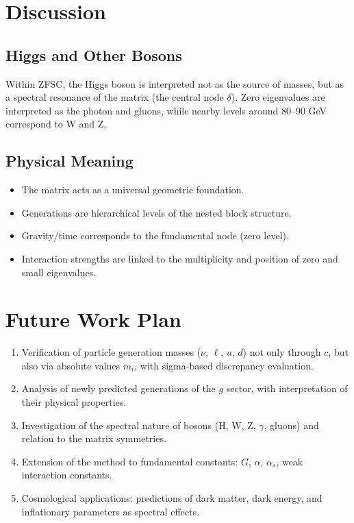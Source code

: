 \documentclass[12pt,a4paper]{article}
\begin{document}
\section{Discussion}
\subsection{Higgs and Other Bosons}
Within ZFSC, the Higgs boson is interpreted not as the source of masses, but as a spectral resonance of the matrix (the central node $\delta$). 
Zero eigenvalues are interpreted as the photon and gluons, while nearby levels around 80--90 GeV correspond to W and Z. 

\subsection{Physical Meaning}
\begin{itemize}
  \item The matrix acts as a universal geometric foundation.  
  \item Generations are hierarchical levels of the nested block structure.  
  \item Gravity/time corresponds to the fundamental node (zero level).  
  \item Interaction strengths are linked to the multiplicity and position of zero and small eigenvalues.  
\end{itemize}

\section{Future Work Plan}
\begin{enumerate}
  \item Verification of particle generation masses ($\nu$, $\ell$, $u$, $d$) not only through $c$, but also via absolute values $m_i$, with sigma-based discrepancy evaluation.  
  \item Analysis of newly predicted generations of the $g$ sector, with interpretation of their physical properties.  
  \item Investigation of the spectral nature of bosons (H, W, Z, $\gamma$, gluons) and relation to the matrix symmetries.  
  \item Extension of the method to fundamental constants: $G$, $\alpha$, $\alpha_s$, weak interaction constants.  
  \item Cosmological applications: predictions of dark matter, dark energy, and inflationary parameters as spectral effects.  
\end{enumerate}
\end{document}
